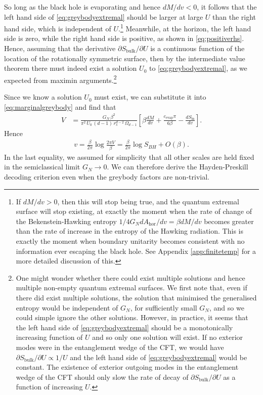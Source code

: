 \documentclass[12pt]{article}
\begin{document}
So long as the black hole is evaporating and hence $dM/dv < 0$, it follows that the left hand side of \eqref{eq:greybodyextremal} should be larger at large $U$ than the right hand side, which is independent of $U$.\footnote{If $dM/dv > 0$, then this will stop being true, and the quantum extremal surface will stop existing, at exactly the moment when the rate of change of the Bekenstein-Hawking entropy $1/ 4G_N dA_\text{hor}/dv = \beta dM/dv$ becomes greater than the rate of increase in the entropy of the Hawking radiation. This is exactly the moment when boundary unitarity becomes consistent with no information ever escaping the black hole. See Appendix \ref{app:finitetemp} for a more detailed discussion of this.} Meanwhile, at the horizon, the left hand side is zero, while the right hand side is positive, as shown in \eqref{eq:positiverhs}. Hence, assuming that the derivative $\partial S_\text{bulk}/ \partial U$ is a continuous function of the location of the rotationally symmetric surface, then by the intermediate value theorem there must indeed exist a solution $U_0$ to \eqref{eq:greybodyextremal}, as we expected from maximin arguments.\footnote{One might wonder whether there could exist multiple solutions and hence multiple non-empty quantum extremal surfaces. We first note that, even if there did exist multiple solutions, the solution that minimised the generalised entropy would be independent of $G_N$, for sufficiently small $G_N$, and so we could simple ignore the other solutions. However, in practice, it seems that the left hand side of \eqref{eq:greybodyextremal} should be a monotonically increasing function of $U$ and so only one solution will exist. If no exterior modes were in the entanglement wedge of the CFT, we would have $\partial S_\text{bulk}/\partial U \propto 1/U$ and the left hand side of \eqref{eq:greybodyextremal} would be constant. The existence of exterior outgoing modes in the entanglement wedge of the CFT should only slow the rate of decay of $\partial S_\text{bulk}/\partial U$ as a function of increasing $U$.}
 
Since we know a solution $U_0$ must exist, we can substitute it into \eqref{eq:marginalgreybody} and find that
\begin{align}
V &=  \frac{G_N \,\beta^2}{\pi^2\,U_0\,(d-1)\, r_s^{d-2} \,\Omega_{d-1}}\left[\beta \frac{d M}{d v} + \frac{c_\text{evap} \pi}{6 \beta} - \frac{d S_\text{in}}{d v}\right].
\end{align}
Hence
\begin{align}
v = \frac{\beta}{2 \pi} \log \frac{2 \pi V}{\beta} = \frac{\beta}{2 \pi} \log S_{BH} + O(\beta).
\end{align}
In the last equality, we assumed for simplicity that all other scales are held fixed in the semiclassical limit $G_N \to 0$. We can therefore derive the Hayden-Preskill decoding criterion even when the greybody factors are non-trivial. 
\end{document}
